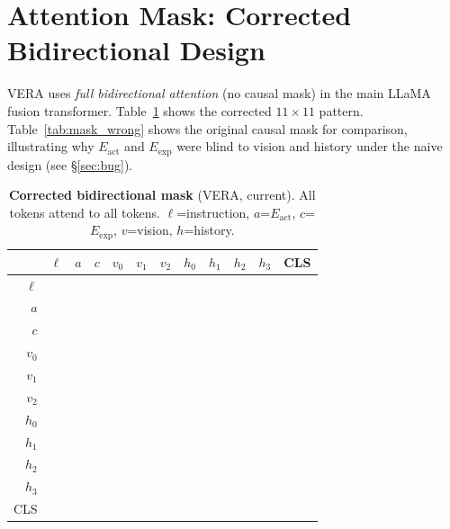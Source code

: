 \documentclass{article}
\newcommand{\cmark}{\ding{51}}
\begin{document}


\clearpage
\appendix

\section{Attention Mask: Corrected Bidirectional Design}
\label{app:mask}

VERA uses \emph{full bidirectional attention} (no causal mask) in the main
LLaMA fusion transformer.
Table~\ref{tab:mask_correct} shows the corrected $11\!\times\!11$ pattern.
Table~\ref{tab:mask_wrong} shows the original causal mask for comparison,
illustrating why $E_{\mathrm{act}}$ and $E_{\mathrm{exp}}$ were blind to
vision and history under the naive design (see \S\ref{sec:bug}).

\begin{table}[h]
\centering
\caption{\textbf{Corrected bidirectional mask} (VERA, current). All tokens attend to all tokens.
         $\ell$=instruction, $a$=$E_\mathrm{act}$, $c$=$E_\mathrm{exp}$, $v$=vision, $h$=history.}
\label{tab:mask_correct}
\scriptsize
\setlength{\tabcolsep}{3.5pt}
\begin{tabular}{r|ccccccccccc}
\toprule
 & $\ell$ & $a$ & $c$ & $v_0$ & $v_1$ & $v_2$ & $h_0$ & $h_1$ & $h_2$ & $h_3$ & CLS \\
\midrule
$\ell$ & \cmark&\cmark&\cmark&\cmark&\cmark&\cmark&\cmark&\cmark&\cmark&\cmark&\cmark \\
$a$    & \cmark&\cmark&\cmark&\cmark&\cmark&\cmark&\cmark&\cmark&\cmark&\cmark&\cmark \\
$c$    & \cmark&\cmark&\cmark&\cmark&\cmark&\cmark&\cmark&\cmark&\cmark&\cmark&\cmark \\
$v_0$  & \cmark&\cmark&\cmark&\cmark&\cmark&\cmark&\cmark&\cmark&\cmark&\cmark&\cmark \\
$v_1$  & \cmark&\cmark&\cmark&\cmark&\cmark&\cmark&\cmark&\cmark&\cmark&\cmark&\cmark \\
$v_2$  & \cmark&\cmark&\cmark&\cmark&\cmark&\cmark&\cmark&\cmark&\cmark&\cmark&\cmark \\
$h_0$  & \cmark&\cmark&\cmark&\cmark&\cmark&\cmark&\cmark&\cmark&\cmark&\cmark&\cmark \\
$h_1$  & \cmark&\cmark&\cmark&\cmark&\cmark&\cmark&\cmark&\cmark&\cmark&\cmark&\cmark \\
$h_2$  & \cmark&\cmark&\cmark&\cmark&\cmark&\cmark&\cmark&\cmark&\cmark&\cmark&\cmark \\
$h_3$  & \cmark&\cmark&\cmark&\cmark&\cmark&\cmark&\cmark&\cmark&\cmark&\cmark&\cmark \\
CLS    & \cmark&\cmark&\cmark&\cmark&\cmark&\cmark&\cmark&\cmark&\cmark&\cmark&\cmark \\
\bottomrule
\end{tabular}
\end{table}
\end{document}
